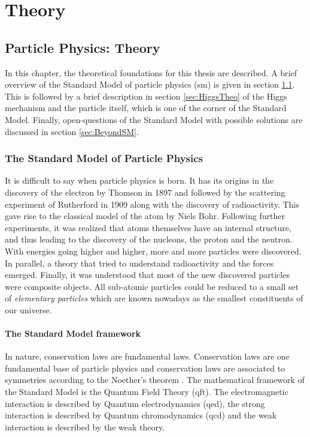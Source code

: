 \part{Theory}

\chapter{Particle Physics: Theory}
\label{chap:Theory}

In this chapter, the theoretical foundations for this thesis are described. A brief overview of the Standard Model of particle physics (\acrshort{sm}) is given in section \ref{sec:SM}. This is followed by a brief description in section \ref{sec:HiggsTheo} of the Higgs mechanism and the particle itself, which is one of the corner of the Standard Model. Finally, open-questions of the Standard Model with possible solutions are discussed in section \ref{sec:BeyondSM}.

\section{The Standard Model of Particle Physics}
\label{sec:SM}

It is difficult to say when particle physics is born. It has its origins in the discovery of the electron by Thomson \cite{JJThomson:1897} in 1897 and followed by the scattering experiment of Rutherford \cite{Rutherford:1911} in 1909 along with the discovery of radioactivity. This gave rise to the classical model of the atom by Niels Bohr. Following further experiments, it was realized that atoms themselves have an internal structure, and thus leading to the discovery of the nucleons, the proton and the neutron. With energies going higher and higher, more and more particles were discovered. In parallel, a theory that tried to understand radioactivity and the forces emerged. Finally, it was understood that most of the new discovered particles were composite objects. All sub-atomic particles could be reduced to a small set of \textit{elementary particles} which are known nowadays as the smallest constituents of our universe.

\subsection{The Standard Model framework}

In nature, conservation laws are fundamental laws. Conservation laws are one fundamental base of particle physics and conservation laws are associated to symmetries according to the Noether's theorem \cite{ENoether1971}. The mathematical framework of the Standard Model is the Quantum Field Theory (\acrshort{qft}). The electromagnetic interaction is described by Quantum electrodynamics (\acrshort{qed}), the strong interaction is described by Quantum chromodynamics (\acrshort{qcd}) and the weak interaction is described by the weak theory.

